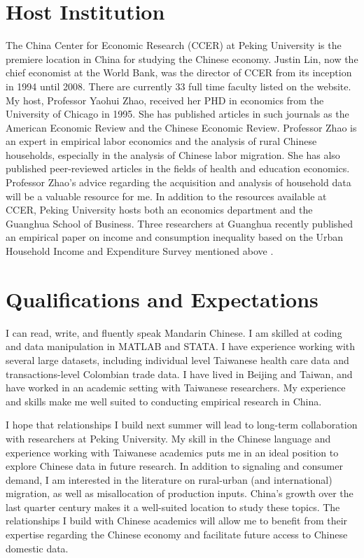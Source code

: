 \documentclass[a4paper,10pt]{article}
\begin{document}
\section{Host Institution}
The China Center for Economic Research (CCER) at Peking University is the premiere location in China for studying the Chinese economy.  Justin Lin, now the chief economist at the World Bank, was the director of CCER from its inception in 1994 until 2008.  There are currently 33 full time faculty listed on the website.  My host, Professor Yaohui Zhao, received her PHD in economics from the University of Chicago in 1995. She has published articles in such journals as the American Economic Review and the Chinese Economic Review.  Professor Zhao is an expert in empirical labor economics and the analysis of rural Chinese households, especially in the analysis of Chinese labor migration.  She has also published peer-reviewed articles in the fields of health and education economics. Professor Zhao's advice regarding the acquisition and analysis of household data will be a valuable resource for me.  In addition to the resources available at CCER, Peking University hosts both an economics department and the Guanghua School of Business.  Three researchers at Guanghua recently published an empirical paper on income and consumption inequality based on the Urban Household Income and Expenditure Survey mentioned above \citep{Caietal2010}.  

\section{Qualifications and Expectations}
I can read, write, and fluently speak Mandarin Chinese.  I am skilled at coding and data manipulation in MATLAB and STATA.  I have experience working with several large datasets, including individual level Taiwanese health care data and transactions-level Colombian trade data.  I have lived in Beijing and Taiwan, and have worked in an academic setting with Taiwanese researchers.  My experience and skills make me well suited to conducting empirical research in China.  

I hope that relationships I build next summer will lead to long-term collaboration with researchers at Peking University.  My skill in the Chinese language and experience working with Taiwanese academics puts me in an ideal position to explore Chinese data in future research.  In addition to signaling and consumer demand, I am interested in the literature on rural-urban (and international) migration, as well as misallocation of production inputs.  China's growth over the last quarter century makes it a well-suited location to study these topics. The relationships I build with Chinese academics will allow me to benefit from their expertise regarding the Chinese economy and facilitate future access to Chinese domestic data. 
\end{document}

